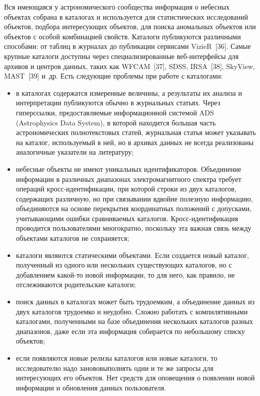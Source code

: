 \begin{multicols}{2}
      Вся имеющаяся у астрономического сообщества информация о небесных объектах 
собрана в каталогах и используется для статистических исследований объектов, подбора 
интересующих объектов, для поиска аномальных объектов или объектов с особой 
комбинацией свойств. Каталоги публикуются различными способами: от таблиц в журналах 
до публикации сервисами VizieR~[36]. Самые крупные каталоги доступны через 
специализированные веб-ин\-тер\-фей\-сы для архивов и центров данных, таких как 
WFCAM~[37], SDSS, IRSA~[38], SkyView, MAST~[39] и~др. Есть следующие 
проблемы при работе с каталогами: 
      \begin{itemize} %
  \item в каталогах содержатся измеренные величины, а результаты их анализа и 
интерпретации пуб\-ли\-ку\-ют\-ся обычно в журнальных статьях. Через гиперссылки, 
предоставляемые информационной системой ADS ({Astrophysics Data System}), в 
которой находится большая часть астрономических полнотекстовых статей, журнальная 
статья может указывать на каталог, используемый в ней, но в архивах данных не всегда 
реализованы аналогичные указатели на литературу;\\[-15pt]
  \item небесные объекты не имеют уникальных идентификаторов. Объединение 
информации в различных диапазонах электромагнитного спектра требует операций 
  кросс-идентификации, при которой строки из двух каталогов, содержащих различную, но 
при связывании вдвойне полезную информацию, объединяются на основе перекрытия 
координатных положений с допусками, учитывающими ошибки сравниваемых каталогов. 
Кросс-идентификация проводится пользователями многократно, поскольку эта важная связь 
между объектами каталогов не сохраняется;\\[-15pt] 
  \item каталоги являются статическими объектами. Ес\-ли создается новый каталог, 
полученный из одного или нескольких существующих каталогов, но с добавлением какой-то 
новой информации, то для него, как правило, не отслеживаются родительские каталоги;\\[-15pt]
  \item поиск данных в каталогах может быть трудоемким, а объединение данных из двух 
каталогов трудоемко и неудобно. Сложно работать с компилятивными каталогами, 
полученными на базе объединения нескольких каталогов разных диапазонов, даже если эта 
информация собирается по небольшому списку объектов;\\[-14pt]
  \item если появляются новые релизы каталогов или новые каталоги, то исследователю 
надо заново\linebreak выполнять одни и те же запросы для ин\-те\-ре\-су\-ющих его объектов. Нет средств 
для оповещения о появлении новой информации и об\-нов\-ле\-ния данных пользователя.
  \end{itemize}
  

\end{multicols}
